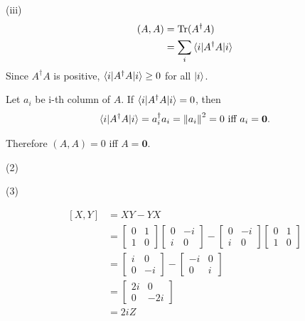(iii)
\begin{align*}
	(A, A) &= \operatorname{Tr} (A^\dagger A)\\
		&= \sum_i \braket{ i | A^\dagger A | i }
\end{align*}
Since $A^\dagger A$ is positive, $\braket{ i | A^\dagger A | i } \geq 0$ for all $\ket{ i }$.


Let $a_i$ be i-th column of $A$.
If $\braket{ i | A^\dagger A | i } = 0$, then
\begin{align*}
	\braket{ i | A^\dagger A | i } = a^\dagger_i a_i = \left\lVert a_i\right\rVert^2 = 0 \text{ iff }a_i = \mathbf{0}.
\end{align*}

Therefore $(A, A) = 0$ iff $A = \mathbf{0}$.

\vspace{5mm}
(2)

(3)


%
%

\begin{align*}
	\left[X, Y \right] &=XY - YX\\
		&= \begin{bmatrix}
		0 & 1 \\
		1 & 0
		\end{bmatrix}
		\begin{bmatrix}
		0 & -i \\
		i & 0
		\end{bmatrix}
		-
		\begin{bmatrix}
		0 & -i \\
		i & 0
		\end{bmatrix}
		\begin{bmatrix}
		0 & 1 \\
		1 & 0
		\end{bmatrix} \\
%
		&=
%
		\begin{bmatrix}
			i & 0 \\
			0 & -i
		\end{bmatrix}
		-
		\begin{bmatrix}
			-i & 0 \\
			0 & i
		\end{bmatrix}\\
%
		&=
%
		\begin{bmatrix}
			2i & 0 \\
			0 & -2i
		\end{bmatrix} \\
%
		&=	2i Z
\end{align*}




